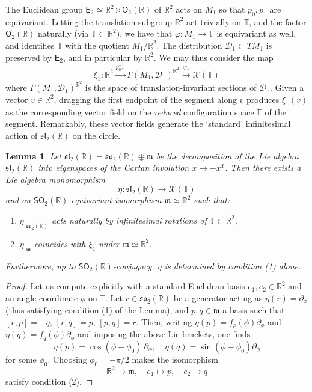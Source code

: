 \documentclass{article}
\def\fsl{\mathfrak{sl}}
\def\fso{\mathfrak{so}}
\def\fm{\mathfrak{m}}
\def\sD{\mathscr{D}}
\def\RR{\mathbb{R}}
\def\TT{\mathbb{T}}
\def\XX{\mathscr{X}}
\def\SO{\mathsf{SO}}
\def\O{\mathsf{O}}
\def\E{\mathsf{E}}
\newtheorem{lem}{Lemma}
\theoremstyle{definition}
\begin{document}
The Euclidean group $\E_2 \simeq \RR^2 \rtimes \O_2(\RR)$ of $\RR^2$ 
acts on $M_1$ so that $p_0,p_1$ are equivariant. 
Letting the translation subgroup $\RR^2$ act trivially on $\TT$,
and the factor $\O_2(\RR)$ naturally (via $\TT \subset \RR^2$),
we have that
$\varphi : M_1 \to \TT$ is equivariant as well,
and identifies $\TT$ with the quotient $M_1/\RR^2$.
The distribution $\sD_1 \subset TM_1$ is preserved by $\E_2$, and in particular
by $\RR^2$.
We may thus consider the map
\begin{equation}
        \label{eq:xi1}
        \xi_1 : \RR^2 \xrightarrow{ p_{0*}^{-1}}  \Gamma(M_1,\sD_1)^{\RR^2} \xrightarrow{\varphi_*} \XX(\TT) 
\end{equation}
where $\Gamma(M_1,\sD_1)^{\RR^2}$ is the space of translation-invariant sections of $\sD_1$.
Given a vector $v \in \RR^2$, dragging the first endpoint
of the segment along $v$ produces $\xi_1(v)$ as the corresponding
vector field on the \emph{reduced} configuration space $\TT$ of the segment.
Remarkably, these vector fields generate the `standard' infinitesimal action of $\fsl_2(\RR)$
on the circle.
\begin{lem}\label{lem:seg-sl2}
        Let $\fsl_2(\RR) = \fso_2(\RR) \oplus \fm$ be the decomposition
        of the Lie algebra $\fsl_2(\RR)$ into eigenspaces of the Cartan
        involution $x\mapsto-x^T$. Then there exists a Lie algebra monomorphism
        $$ \eta : \fsl_2(\RR) \to \XX(\TT) $$
        and an $\SO_2(\RR)$-equivariant isomorphism $\fm\simeq\RR^2$
        such that:
        \begin{enumerate}
                \item $\eta|_{\fso_2(\RR)}$ acts naturally by infinitesimal rotations of $\TT\subset \RR^2$,
                \item $\eta|_\fm$ coincides with $\xi_1$ under $\fm\simeq\RR^2$.
        \end{enumerate}
        Furthermore, up to $\SO_2(\RR)$-conjugacy, $\eta$ is determined by condition (1) alone.
\end{lem}
\begin{proof}
        Let us compute explicitly with a standard Euclidean basis $e_1,e_2 \in \RR^2$
        and an angle coordinate $\phi$ on $\TT$. Let $r \in \fso_2(\RR)$ be a generator
        acting as $\eta(r)=\partial_\phi$ (thus satisfying condition (1) of the Lemma), 
        and $p,q \in \fm$ a basis such that
        $[r,p]=-q$, $[r,q]=p$, $[p,q]=r$.
        Then, writing $\eta(p) = f_p(\phi)\partial_\phi$ and $\eta(q) = f_q(\phi)\partial_\phi$ and
        imposing the above Lie brackets,
        one finds 
        $$ \eta(p) = \cos(\phi-\phi_0)\ \partial_\phi,\quad \eta(q) = \sin(\phi-\phi_0)\partial_\phi $$
        for some $\phi_0$. Choosing $\phi_0=-\pi/2$ makes the isomorphism
        $$ \RR^2 \to \fm,\quad e_1 \mapsto p,\quad e_2\mapsto q $$
        satisfy condition (2).
\end{proof}
\end{document}
